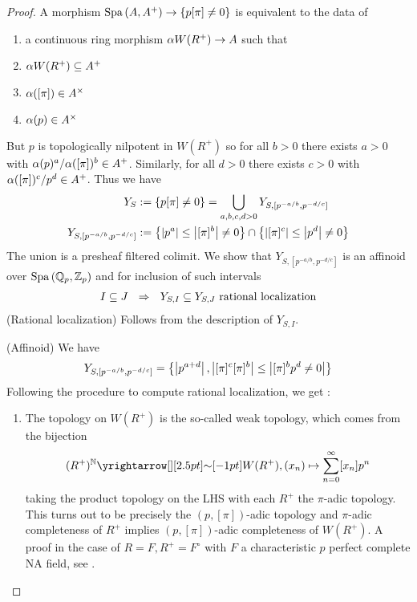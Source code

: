 \documentclass{article}
\begin{document}
\begin{proof}
  A morphism $\mathrm{Spa}\,(A , A^+) \to \left\{p [\pi] \neq 0\right\}$
  is equivalent to the data of 
  \begin{enumerate}
    \item a continuous ring morphism $\alpha W(R^+) \to A$ such that
    \item $\alpha W(R^+) \subseteq A^+$
    \item $\alpha([\pi]) \in A^\times$
    \item $\alpha(p) \in A^\times$
  \end{enumerate}
  But $p$ is topologically nilpotent in $W(R^+)$ 
  so for all $b > 0$ there exists
  $a > 0$ with $\alpha(p)^a / \alpha([\pi])^b \in A^+$.
  Similarly, for all $d > 0$ there exists $c > 0$ with
  $\alpha([\pi])^c / p^d \in A^+$.
  Thus we have \begin{align*}
    Y_S &:= \left\{p [\pi] \neq 0\right\} = 
    \bigcup_{a, b, c, d > 0} Y_{S , [p^{- a / b} , p^{- d / c}]} \\
    Y_{S , [p^{- a / b} , p^{- d / c}]} 
      &:= \left\{\left\vert p^a \right\vert \leq \left\vert [\pi]^b \right\vert \neq 0\right\} \cap 
    \left\{\left\vert [\pi]^c \right\vert \leq \left\vert p^d \right\vert \neq 0\right\}
  \end{align*}
  The union is a presheaf filtered colimit.
  We show that $Y_{S , [p^{- a / b} , p^{- d / c}]}$
  is an affinoid over $\mathrm{Spa}\,(\mathbb{Q}_p , \mathbb{Z}_p)$
  and for inclusion of such intervals
  \begin{align*}
    I \subseteq J
    \,\,\,\,\Rightarrow \,\,\,\,
    Y_{S, I} \subseteq 
    Y_{S , J}
    \text{ rational localization}
  \end{align*}
  (Rational localization) 
  Follows from the description of $Y_{S , I}$.

  (Affinoid) We have \begin{align*}
    Y_{S, [p^{- a / b} , p^{- d / c}]}
    = \left\{
      \left\vert {p}^{a + d} \right\vert , \left\vert [\pi]^{c}[\pi]^b \right\vert \leq \left\vert [\pi]^b p^d \neq 0 \right\vert
      \right\}
  \end{align*}
  Following the procedure to compute rational localization, we get : 
  \begin{enumerate}
    \item The topology on $W(R^+)$ is the so-called weak topology,
    which comes from the bijection \[
      (R^+)^{\bN} \map{\sim}{} W(R^+) , (x_n) \mapsto \sum_{n = 0}^\infty [x_n] p^n
    \]
    taking the product topology on the LHS with each $R^+$ 
    the $\pi$-adic topology.
    This turns out to be precisely the $(p , [\pi])$-adic topology
    and $\pi$-adic completeness of $R^+$ implies
    $(p , [\pi])$-adic completeness of $W(R^+)$.
    A proof in the case of $R = F , R^+ = F^\circ$
    with $F$ a characteristic $p$ perfect complete NA field,
    see \cite[Prop. 1.4.11]{FF18}.


\end{enumerate}
\end{proof}
\end{document}
